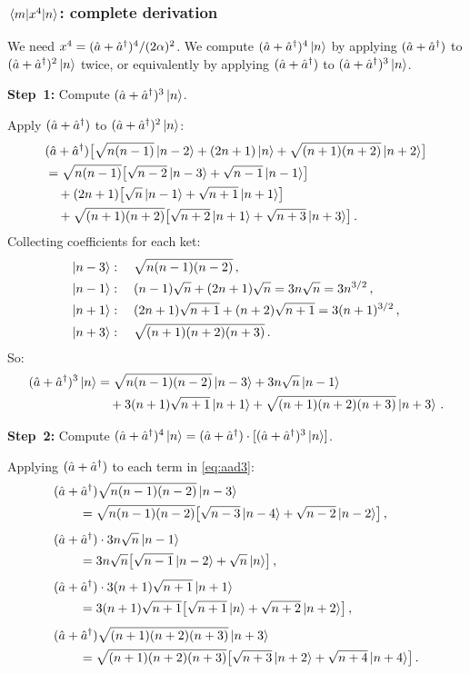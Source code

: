 \subsubsection{$\mel{m}{x^4}{n}$: complete derivation}

We need $x^4 = (\hat{a}+\hat{a}^{\dagger})^4/(2\alpha)^2$. We compute $(\hat{a}+\hat{a}^{\dagger})^4\ket{n}$
by applying $(\hat{a}+\hat{a}^{\dagger})$ to $(\hat{a}+\hat{a}^{\dagger})^2\ket{n}$ twice, or equivalently by
applying $(\hat{a}+\hat{a}^{\dagger})$ to $(\hat{a}+\hat{a}^{\dagger})^3\ket{n}$.

\textbf{Step~1:} Compute $(\hat{a}+\hat{a}^{\dagger})^3\ket{n}$.

Apply $(\hat{a}+\hat{a}^{\dagger})$ to $(\hat{a}+\hat{a}^{\dagger})^2\ket{n}$:
\begin{align}
  &(\hat{a}+\hat{a}^{\dagger})\bigl[\sqrt{n(n-1)}\ket{n-2} + (2n+1)\ket{n} + \sqrt{(n+1)(n+2)}\ket{n+2}\bigr]\notag\\
  &= \sqrt{n(n-1)}\bigl[\sqrt{n-2}\ket{n-3}+\sqrt{n-1}\ket{n-1}\bigr]\notag\\
  &\quad + (2n+1)\bigl[\sqrt{n}\ket{n-1}+\sqrt{n+1}\ket{n+1}\bigr]\notag\\
  &\quad + \sqrt{(n+1)(n+2)}\bigl[\sqrt{n+2}\ket{n+1}+\sqrt{n+3}\ket{n+3}\bigr]\,.
\end{align}
Collecting coefficients for each ket:
\begin{align}
  \ket{n-3}&:\quad \sqrt{n(n-1)(n-2)}\,,\notag\\
  \ket{n-1}&:\quad (n-1)\sqrt{n} + (2n+1)\sqrt{n} = 3n\sqrt{n} = 3n^{3/2}\,,\notag\\
  \ket{n+1}&:\quad (2n+1)\sqrt{n+1} + (n+2)\sqrt{n+1} = 3(n+1)^{3/2}\,,\notag\\
  \ket{n+3}&:\quad \sqrt{(n+1)(n+2)(n+3)}\,.\notag
\end{align}
So:
\begin{align}\label{eq:aad3}
  (\hat{a}+\hat{a}^{\dagger})^3\ket{n}
  &= \sqrt{n(n-1)(n-2)}\ket{n-3} + 3n\sqrt{n}\ket{n-1}\notag\\
  &\quad + 3(n+1)\sqrt{n+1}\ket{n+1} + \sqrt{(n+1)(n+2)(n+3)}\ket{n+3}\,.
\end{align}

\textbf{Step~2:} Compute $(\hat{a}+\hat{a}^{\dagger})^4\ket{n} = (\hat{a}+\hat{a}^{\dagger})\cdot[(\hat{a}+\hat{a}^{\dagger})^3\ket{n}]$.

Applying $(\hat{a}+\hat{a}^{\dagger})$ to each term in \cref{eq:aad3}:
\begin{align}
  &(\hat{a}+\hat{a}^{\dagger})\sqrt{n(n-1)(n-2)}\ket{n-3}\notag\\
  &\qquad= \sqrt{n(n-1)(n-2)}\bigl[\sqrt{n-3}\ket{n-4}+\sqrt{n-2}\ket{n-2}\bigr]\,,\\[4pt]
  &(\hat{a}+\hat{a}^{\dagger})\cdot 3n\sqrt{n}\ket{n-1}\notag\\
  &\qquad= 3n\sqrt{n}\bigl[\sqrt{n-1}\ket{n-2}+\sqrt{n}\ket{n}\bigr]\,,\\[4pt]
  &(\hat{a}+\hat{a}^{\dagger})\cdot 3(n+1)\sqrt{n+1}\ket{n+1}\notag\\
  &\qquad= 3(n+1)\sqrt{n+1}\bigl[\sqrt{n+1}\ket{n}+\sqrt{n+2}\ket{n+2}\bigr]\,,\\[4pt]
  &(\hat{a}+\hat{a}^{\dagger})\sqrt{(n+1)(n+2)(n+3)}\ket{n+3}\notag\\
  &\qquad= \sqrt{(n+1)(n+2)(n+3)}\bigl[\sqrt{n+3}\ket{n+2}+\sqrt{n+4}\ket{n+4}\bigr]\,.
\end{align}

